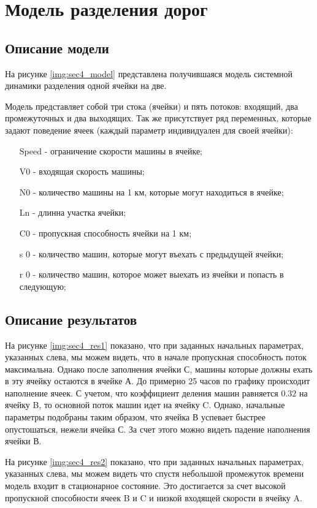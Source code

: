 \section{Модель разделения дорог}

\subsection{Описание модели}

На рисунке \ref{img:sec4_model} представлена получившаяся модель системной динамики разделения одной ячейки на две.

Модель представляет собой три стока (ячейки) и пять потоков: входящий, два промежуточных и два выходящих.
Так же присутствует ряд переменных, которые задают поведение ячеек (каждый параметр индивидуален для своей ячейки):
\begin{itemize}
    \item[Speed] - ограничение скорости машины в ячейке;
    \item[V0] - входящая скорость машины;
    \item[N0] - количество машины на 1 км, которые могут находиться в ячейке;
    \item[Ln] - длинна участка ячейки;
    \item[C0] - пропускная способность ячейки на 1 км;
    \item[s 0] - количество машин, которые могут въехать с предыдущей ячейки;
    \item[r 0] - количество машин, которое может выехать из ячейки и попасть в следующую;
\end{itemize}


\subsection{Описание результатов}

На рисунке \ref{img:sec4_res1} показано, что при заданных начальных параметрах, указанных слева, мы можем видеть, что в начале пропускная способность поток максимальна. Однако после заполнения ячейки С, машины которые должны ехать в эту ячейку остаются в ячейке А. До примерно 25 часов по графику происходит наполнение ячеек. С учетом, что коэффициент деления машин равняется $0.32$ на ячейку B, то основной поток машин идет на ячейку C. Однако, начальные параметры подобраны таким образом, что ячейка В успевает быстрее опустошаться, нежели ячейка С. За счет этого можно видеть падение наполнения ячейки В.


На рисунке \ref{img:sec4_res2} показано, что при заданных начальных параметрах, указанных слева, мы можем видеть что спустя небольшой промежуток времени модель входит в стационарное состояние. Это достигается за счет высокой пропускной способности ячеек B и C и низкой входящей скорости в ячейку A.


\clearpage